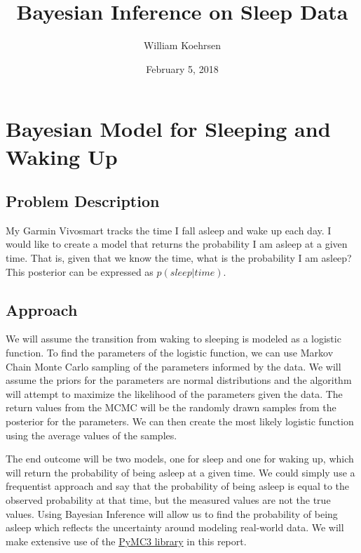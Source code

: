 \documentclass[12pt]{article}
\title{Bayesian Inference on Sleep Data}
\author{William Koehrsen}
\date{February 5, 2018}
\begin{document}
    
    
    \maketitle
    \tableofcontents
    

    
    \hypertarget{bayesian-model-for-sleeping-and-waking-up}{%
\section{Bayesian Model for Sleeping and Waking
Up}\label{bayesian-model-for-sleeping-and-waking-up}}

    \hypertarget{problem-description}{%
\subsection{Problem Description}\label{problem-description}}

My Garmin Vivosmart tracks the time I fall asleep and wake up each day.
I would like to create a model that returns the probability I am asleep
at a given time. That is, given that we know the time, what is the
probability I am asleep? This posterior can be expressed as
\(p(sleep | time)\).

    \hypertarget{approach}{%
\subsection{Approach}\label{approach}}

We will assume the transition from waking to sleeping is modeled as a
logistic function. To find the parameters of the logistic function, we
can use Markov Chain Monte Carlo sampling of the parameters informed by
the data. We will assume the priors for the parameters are normal
distributions and the algorithm will attempt to maximize the likelihood
of the parameters given the data. The return values from the MCMC will
be the randomly drawn samples from the posterior for the parameters. We
can then create the most likely logistic function using the average
values of the samples.

The end outcome will be two models, one for sleep and one for waking up,
which will return the probability of being asleep at a given time. We
could simply use a frequentist approach and say that the probability of
being asleep is equal to the observed probability at that time, but the
measured values are not the true values. Using Bayesian Inference will
allow us to find the probability of being asleep which reflects the
uncertainty around modeling real-world data. We will make extensive use
of the \href{https://github.com/pymc-devs/pymc3}{PyMC3 library} in this
report.
\end{document}

